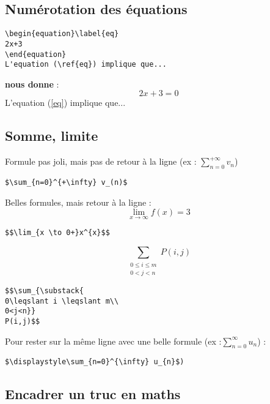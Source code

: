 \documentclass[12pt,french,oneside]{report}
\begin{document}
\begin{spacing}{1.2}
\subsection{Numérotation des équations}

\begin{verbatim} 
\begin{equation}\label{eq}
2x+3
\end{equation}
L'equation (\ref{eq}) implique que...
\end{verbatim}

\textbf{nous donne} : \\

\begin{equation}\label{eq}
2x+3=0
\end{equation}
L'equation (\ref{eq}) implique que...

\subsection{Somme, limite}

Formule pas joli, mais pas de retour à la ligne (ex : $\sum_{n=0}^{+\infty} v_{n}$)

\begin{verbatim}
$\sum_{n=0}^{+\infty} v_(n)$
\end{verbatim}

Belles formules, mais retour à la ligne : $$\lim_{x \to \infty}f(x)=3$$

\begin{verbatim}
$$\lim_{x \to 0+}x^{x}$$
\end{verbatim}

$$\sum_{\substack{
0\leqslant i \leqslant m\\
0<j<n}}
P(i,j)$$

\begin{verbatim}
$$\sum_{\substack{
0\leqslant i \leqslant m\\
0<j<n}}
P(i,j)$$
\end{verbatim}

Pour rester sur la même ligne avec une belle formule (ex :$\displaystyle\sum_{n=0}^{\infty} u_{n}$) :

\begin{verbatim}
$\displaystyle\sum_{n=0}^{\infty} u_{n}$)
\end{verbatim}

\subsection{Encadrer un truc en maths}


\end{spacing}
\end{document}
